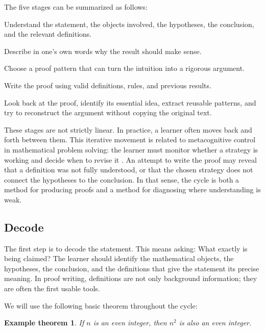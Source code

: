 \documentclass[11pt,a4paper]{article}
\newtheorem*{exampletheorem}{Example theorem}
\begin{document}
The five stages can be summarized as follows:

\begin{description}[leftmargin=3.2cm, style=nextline]
    \item[Decode] Understand the statement, the objects involved, the hypotheses, the conclusion, and the relevant definitions.
    \item[Explain] Describe in one's own words why the result should make sense.
    \item[Strategize] Choose a proof pattern that can turn the intuition into a rigorous argument.
    \item[Prove] Write the proof using valid definitions, rules, and previous results.
    \item[Reflect] Look back at the proof, identify its essential idea, extract reusable patterns, and try to reconstruct the argument without copying the original text.
\end{description}

These stages are not strictly linear. In practice, a learner often moves back and forth between them. This iterative movement is related to metacognitive control in mathematical problem solving: the learner must monitor whether a strategy is working and decide when to revise it \cite{schoenfeld1992learning}. An attempt to write the proof may reveal that a definition was not fully understood, or that the chosen strategy does not connect the hypotheses to the conclusion. In that sense, the cycle is both a method for producing proofs and a method for diagnosing where understanding is weak.

\subsection{Decode}

The first step is to decode the statement. This means asking: What exactly is being claimed? The learner should identify the mathematical objects, the hypotheses, the conclusion, and the definitions that give the statement its precise meaning. In proof writing, definitions are not only background information; they are often the first usable tools.

We will use the following basic theorem throughout the cycle:

\begin{exampletheorem}
If \(n\) is an even integer, then \(n^2\) is also an even integer.
\end{exampletheorem}
\end{document}
